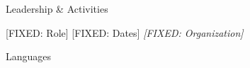 \documentclass{resume}
\begin{document}
\begin{rSection}{Leadership \& Activities}

\begin{rSubsection}{[FIXED: Role]}%
                   {\textcolor{black!60}{[FIXED: Dates]}}%
                   {\em [FIXED: Organization]}{}
\item [GENERATE: Bullet 1 or FIXED Bullet]
\end{rSubsection}

\end{rSection}


\vspace{-0.1cm}
\begin{rSection2}{Languages}
\item [FIXED: Language1: Level \quad|\quad Language2: Level]
\end{rSection2}
\end{document}

